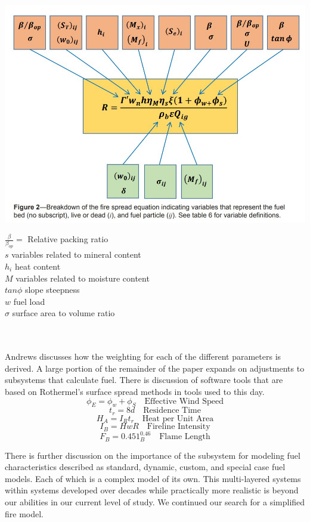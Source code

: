 \documentclass{article}
\begin{document}
\begin{minipage}{.47\textwidth}
        \includegraphics[scale=0.35]{Andrews_final_spread_equation.jpg}
\end{minipage}
%
\hfill
%
\begin{minipage}{.47\textwidth}
    $\frac{\beta}{\beta_{op}}=$ Relative packing ratio\\
    $s$ variables related to mineral content\\
    $h_i$ heat content\\
    $M$ variables related to moisture content\\
    $tan\phi$ slope steepness\\
    $w$ fuel load\\
    $\sigma$ surface area to volume ratio
\end{minipage}\\
\\
Andrews discusses how the weighting for each of the different parameters is derived. A large portion of the remainder of the paper expands on adjustments to subsystems that calculate fuel.  There is discussion of software tools that are based on Rothermel's surface spread methods in tools used to this day.
$$\phi_E=\phi_w+\phi_S \quad \text{Effective Wind Speed}$$
$$t_r=8d\quad \text{Residence Time}$$
$$H_A=I_Rt_r\quad \text{Heat per Unit Area}$$
$$I_B=HwR\quad \text{Fireline Intensity}$$
$$F_B=0.451_B^{0.46}\quad \text{Flame Length}$$

There is further discussion on the importance of the subsystem for modeling fuel characteristics described as standard, dynamic, custom, and special case fuel models. Each of which is a complex model of its own. This multi-layered systems within systems developed over decades while practically more realistic is beyond our abilities in our current level of study.  We continued our search for a simplified fire model.  
\end{document}
